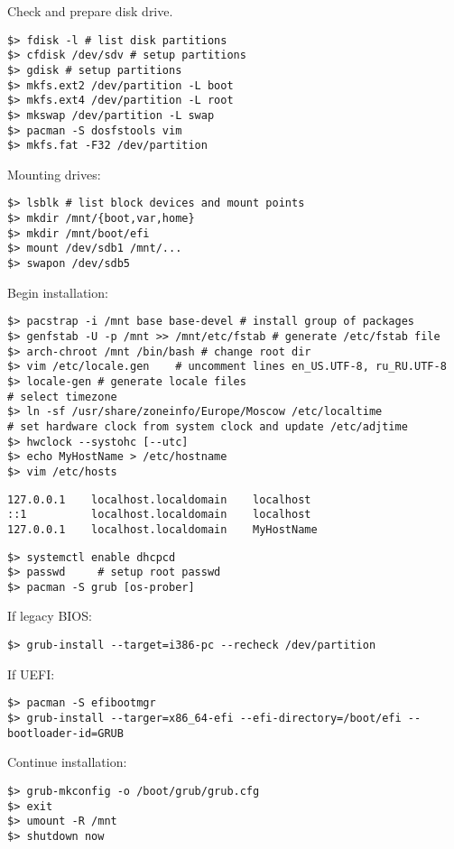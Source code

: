 \documentclass[a4paper, 12pt]{article}
\begin{document}
Check and prepare disk drive.
\begin{lstlisting}
$> fdisk -l # list disk partitions
$> cfdisk /dev/sdv # setup partitions
$> gdisk # setup partitions
$> mkfs.ext2 /dev/partition -L boot
$> mkfs.ext4 /dev/partition -L root
$> mkswap /dev/partition -L swap
$> pacman -S dosfstools vim
$> mkfs.fat -F32 /dev/partition
\end{lstlisting}

Mounting drives:
\begin{lstlisting}
$> lsblk # list block devices and mount points
$> mkdir /mnt/{boot,var,home}
$> mkdir /mnt/boot/efi
$> mount /dev/sdb1 /mnt/...
$> swapon /dev/sdb5
\end{lstlisting}

Begin installation:
\begin{lstlisting}
$> pacstrap -i /mnt base base-devel # install group of packages
$> genfstab -U -p /mnt >> /mnt/etc/fstab # generate /etc/fstab file
$> arch-chroot /mnt /bin/bash # change root dir
$> vim /etc/locale.gen    # uncomment lines en_US.UTF-8, ru_RU.UTF-8
$> locale-gen # generate locale files
# select timezone
$> ln -sf /usr/share/zoneinfo/Europe/Moscow /etc/localtime
# set hardware clock from system clock and update /etc/adjtime
$> hwclock --systohc [--utc]
$> echo MyHostName > /etc/hostname
$> vim /etc/hosts
\end{lstlisting}

\begin{lstlisting}[style=style_file,caption={/etc/hosts add lines:}]
127.0.0.1    localhost.localdomain    localhost
::1          localhost.localdomain    localhost
127.0.0.1    localhost.localdomain    MyHostName
\end{lstlisting}

\begin{lstlisting}
$> systemctl enable dhcpcd
$> passwd     # setup root passwd
$> pacman -S grub [os-prober]
\end{lstlisting}

If legacy BIOS:
\begin{lstlisting}
$> grub-install --target=i386-pc --recheck /dev/partition
\end{lstlisting}

If UEFI:
\begin{lstlisting}
$> pacman -S efibootmgr
$> grub-install --targer=x86_64-efi --efi-directory=/boot/efi --bootloader-id=GRUB
\end{lstlisting}

Continue installation:
\begin{lstlisting}
$> grub-mkconfig -o /boot/grub/grub.cfg
$> exit
$> umount -R /mnt
$> shutdown now
\end{lstlisting}
\end{document}
